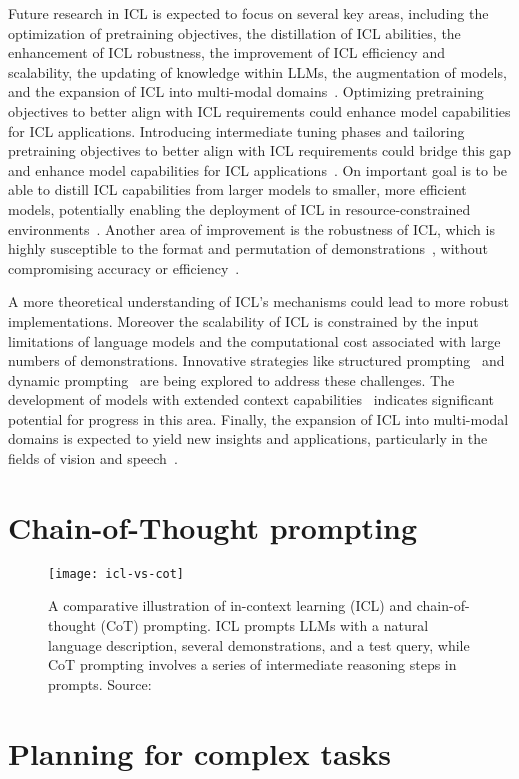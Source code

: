 Future research in ICL is expected to focus on several key areas, including the optimization of pretraining objectives, the distillation of ICL abilities, the enhancement of ICL robustness, the improvement of ICL efficiency and scalability, the updating of knowledge within LLMs, the augmentation of models, and the expansion of ICL into multi-modal domains~\cite{dong2023survey}.
Optimizing pretraining objectives to better align with ICL requirements could enhance model capabilities for ICL applications.
Introducing intermediate tuning phases and tailoring pretraining objectives to better align with ICL requirements could bridge this gap and enhance model capabilities for ICL applications~\cite{shin2022effect}.
On important goal is to be able to distill ICL capabilities from larger models to smaller, more efficient models, potentially enabling the deployment of ICL in resource-constrained environments~\cite{magister2022teaching}.
Another area of improvement is the robustness of ICL, which is highly susceptible to the format and permutation of demonstrations~\cite{zhao2021calibrate, lu2022fantastically}, without compromising accuracy or efficiency~\cite{chen2024relation}.

A more theoretical understanding of ICL's mechanisms could lead to more robust implementations.
Moreover the scalability of ICL is constrained by the input limitations of language models and the computational cost associated with large numbers of demonstrations.
Innovative strategies like structured prompting~\cite{hao2022structured} and dynamic prompting~\cite{wang2023efficient} are being explored to address these challenges.
The development of models with extended context capabilities~\cite{li2023contextual} indicates significant potential for progress in this area.
Finally, the expansion of ICL into multi-modal domains is expected to yield new insights and applications, particularly in the fields of vision and speech~\cite{dong2023survey}.


\section{Chain-of-Thought prompting}
\label{sec:chain-of-thought}

\begin{figure}[h!]
	\centering
	\texttt{[image: icl-vs-cot]}
	\caption{A comparative illustration of in-context learning (ICL) and chain-of-thought (CoT) prompting. ICL prompts LLMs with a natural language description, several demonstrations, and a test query, while CoT prompting involves a series of intermediate reasoning steps in prompts. Source: \textcite{survey}}
	\label{fig:chain-of-thought}
\end{figure}




\section{Planning for complex tasks}
\label{sec:planning}
\lipsum